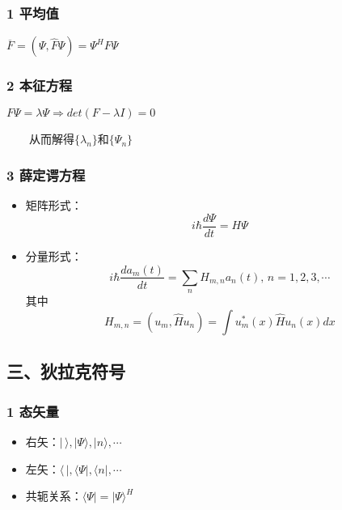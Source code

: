 \documentclass[UTF8,twocolumn]{ctexart}
\providecommand{\tightlist}{%
  \setlength{\itemsep}{0pt}\setlength{\parskip}{0pt}}
\begin{document}
\hypertarget{ux5e73ux5747ux503c}{%
\subsubsection{1 平均值}\label{ux5e73ux5747ux503c}}

\begin{center}
  \(\overline{F}=(\Psi,\hat{F}\Psi)=\Psi^HF\Psi\)
\end{center}

\hypertarget{ux672cux5f81ux65b9ux7a0b}{%
\subsubsection{2 本征方程}\label{ux672cux5f81ux65b9ux7a0b}}

\begin{center}
  \(F\Psi=\lambda\Psi\Rightarrow det(F-\lambda I)=0\)
\end{center}

  从而解得\(\{\lambda_n\}\)和\(\{\Psi_n\}\)

\hypertarget{ux859bux5b9aux8c14ux65b9ux7a0b}{%
\subsubsection{3 薛定谔方程}\label{ux859bux5b9aux8c14ux65b9ux7a0b}}

\begin{itemize}
\tightlist
\item
  矩阵形式： \[i\hbar\frac{d\Psi}{dt}=H\Psi\]
\item
  分量形式：
  \[i\hbar\frac{da_m(t)}{dt}=\sum_nH_{m,n}a_n(t),\,n=1,2,3,\cdots\] 其中
  \[H_{m,n}=(u_m,\hat{H}u_n)=\int u^*_m(x)\hat{H}u_n(x)dx\]
\end{itemize}

\hypertarget{ux4e09ux72c4ux62c9ux514bux7b26ux53f7}{%
\subsection{三、狄拉克符号}\label{ux4e09ux72c4ux62c9ux514bux7b26ux53f7}}

\hypertarget{ux6001ux77e2ux91cf-1}{%
\subsubsection{1 态矢量}\label{ux6001ux77e2ux91cf-1}}

\begin{itemize}
\tightlist
\item
  右矢：\(|\,\rangle,|\Psi\rangle,|n\rangle,\cdots\)
\item
  左矢：\(\langle\,|,\langle\Psi|,\langle n|,\cdots\)
\item
  共轭关系：\(\langle\Psi|=|\Psi\rangle^H\)
\end{itemize}
\end{document}
